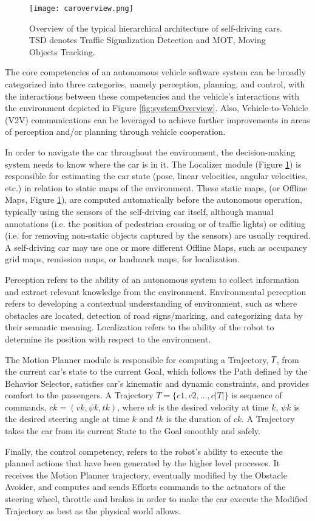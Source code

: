 \begin{figure}[h]
    \centering
    \texttt{[image: caroverview.png]}
    \caption{Overview of the typical hierarchical architecture of self-driving cars. TSD denotes Traffic Signalization Detection and MOT, Moving Objects Tracking.}
    \label{fig:caroverview}
\end{figure}

The core competencies of an autonomous vehicle software system can be broadly
categorized into three categories, namely perception, planning, and control,
with the interactions between these competencies and the vehicle’s interactions
with the environment depicted in Figure \ref{fig:systemOverview}. Also,
Vehicle-to-Vehicle (V2V) communications can be leveraged to achieve further
improvements in areas of perception and/or planning through vehicle cooperation.

In order to navigate the car throughout the environment, the decision-making
system needs to know where the car is in it. The Localizer module (Figure
\ref{fig:caroverview}) is responsible for estimating the car state (pose, linear
velocities, angular velocities, etc.) in relation to static maps of the
environment. These static maps, (or Offline Maps, Figure \ref{fig:caroverview}),
are computed automatically before the autonomous operation, typically using the
sensors of the self-driving car itself, although manual annotations (i.e. the
position of pedestrian crossing or of traffic lights) or editing (i.e. for
removing non-static objects captured by the sensors) are usually required. A
self-driving car may use one or more different Offline Maps, such as occupancy
grid maps, remission maps, or landmark maps, for localization.

Perception refers to the ability of an autonomous system to collect information
and extract relevant knowledge from the environment. Environmental perception
refers to developing a contextual understanding of environment, such as where
obstacles are located, detection of road signs/marking, and categorizing data by
their semantic meaning. Localization refers to the ability of the robot to
determine its position with respect to the environment.

The Motion Planner module is responsible for computing a Trajectory, 𝑇, from
the current car’s state to the current Goal, which follows the Path defined by
the Behavior Selector, satisfies car’s kinematic and dynamic constraints, and
provides comfort to the passengers. A Trajectory $ T = \{c1, c2, \ldots, c|T|\} $ is
sequence of commands, $ ck = (vk, \psi k, tk) $, where $vk$ is the desired
velocity at time $k$, $\psi k$ is the desired steering angle at time $k$ and $ tk$ is
the duration of $ck$. A Trajectory takes the car from its current State to the
Goal smoothly and safely.

Finally, the control competency, refers to the robot’s ability to execute the
planned actions that have been generated by the higher level processes. It
receives the Motion Planner trajectory, eventually modified by the Obstacle
Avoider, and computes and sends Efforts commands to the actuators of the
steering wheel, throttle and brakes in order to make the car execute the
Modified Trajectory as best as the physical world allows.
